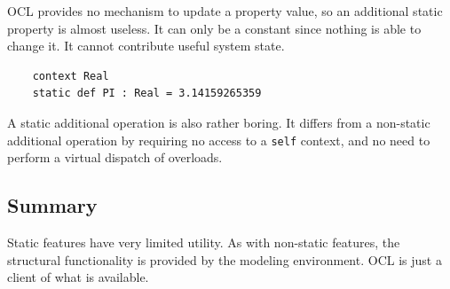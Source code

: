 \documentclass[sigconf]{acmart}
\begin{document}
OCL provides no mechanism to update a property value, so an additional static property is almost useless. It can only be a constant since nothing is able to change it. It cannot contribute useful system state.

\begin{verbatim}
	context Real
	static def PI : Real = 3.14159265359
\end{verbatim} 

A static additional operation is also rather boring. It differs from a non-static additional operation by requiring no access to a \verb|self| context, and no need to perform a virtual dispatch of overloads.

\subsection{Summary}

Static features have very limited utility. As with non-static features, the structural functionality is provided by the modeling environment. OCL is just a client of what is available.



\end{document}
